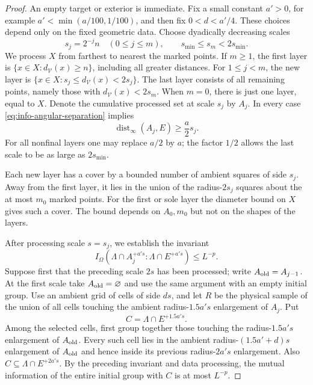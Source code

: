 \documentclass[11pt]{article}
\numberwithin{equation}{section}
\theoremstyle{definition}
\theoremstyle{remark}
\DeclareMathOperator{\dist}{dist}
\begin{document}
\begin{proof}
An empty target or exterior is immediate.  Fix a small constant
$a'>0$, for example $a'<\min(a/100,1/100)$, and then fix
$0<d<a'/4$.  These choices depend only on the fixed geometric data.
Choose dyadically decreasing scales
\[
 s_j=2^{-j}n\quad(0\le j\le m),
 \qquad s_{\min}\le s_m<2s_{\min}.
\]
We process $X$ from farthest to nearest the marked points.  If $m\ge1$,
the first layer is $\{x\in X:d_{\mathcal V}(x)\ge n\}$, including all
greater distances.  For $1\le j<m$, the new layer is
$\{x\in X:s_j\le d_{\mathcal V}(x)<2s_j\}$.  The last layer consists
of all remaining points, namely those with
$d_{\mathcal V}(x)<2s_m$.  When $m=0$, there is just one layer, equal
to $X$.  Denote the cumulative processed set at scale $s_j$ by $A_j$.
In every case \eqref{eq:info-angular-separation} implies
\begin{equation}
 \dist_\infty(A_j,E)\ge \frac a2 s_j.
 \label{eq:info-cumulative-separation}
\end{equation}
For all nonfinal layers one may replace $a/2$ by $a$; the factor $1/2$
allows the last scale to be as large as $2s_{\min}$.

Each new layer has a cover by a bounded number of ambient squares of
side $s_j$.  Away from the first layer, it lies in the union of the
radius-$2s_j$ squares about the at most $m_0$ marked points.  For the
first or sole layer the diameter bound on $X$ gives such a cover.
The bound depends on $A_0,m_0$ but not on the shapes of the layers.

After processing scale $s=s_j$, we establish the invariant
\begin{equation}
 I_\Omega(\Lambda\cap A_j^{+a's}:\Lambda\cap E^{+a's})\le L^{-p}.
 \label{eq:info-annular-invariant}
\end{equation}
Suppose first that the preceding scale $2s$ has been processed; write
$A_{\rm old}=A_{j-1}$.  At the first scale take
$A_{\rm old}=\varnothing$ and use the same argument with an empty
initial group.  Use an ambient grid of cells of side $ds$, and let
$R$ be the physical sample of the union of all cells touching the
ambient radius-$1.5a's$ enlargement of $A_j$.  Put
\[
 C=\Lambda\cap E^{+1.5a's}.
\]
Among the selected cells, first group together those touching the
radius-$1.5a's$ enlargement of $A_{\rm old}$.  Every such cell lies in
the ambient radius-$(1.5a'+d)s$ enlargement of $A_{\rm old}$ and hence
inside its previous radius-$2a's$ enlargement.  Also
$C\subseteq\Lambda\cap E^{+2a's}$.  By the preceding invariant and data
processing, the mutual information of the entire initial group with
$C$ is at most $L^{-p}$.


\end{proof}
\end{document}
